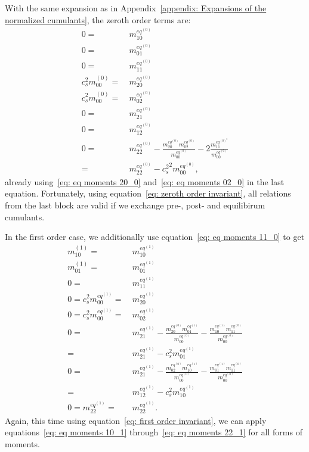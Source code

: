 With the same expansion as in Appendix~\ref{appendix: Expansions of the normalized cumulants}, the zeroth order terms are:
\begin{align}
  \label{eq: eq moments 10_0}
  0 = &\ m_{10}^{eq^{(0)}}
  \\
  \label{eq: eq moments 01_0}
  0 = &\ m_{01}^{eq^{(0)}}
  \\
  \label{eq: eq moments 11_0}
  0 = &\ m_{11}^{eq^{(0)}}
  \\
  \label{eq: eq moments 20_0}
  c_s^2 m_{00}^{(0)} = &\ m_{20}^{eq^{(0)}}
  \\
  \label{eq: eq moments 02_0}
  c_s^2 m_{00}^{(0)} = &\ m_{02}^{eq^{(0)}}
  \\
  \label{eq: eq moments 21_0}
  0 = &\ m_{21}^{eq^{(0)}}
  \\
  \label{eq: eq moments 12_0}
  0 = &\ m_{12}^{eq^{(0)}}
  \\
  \label{eq: eq moments 22_0}
  0 = &\ m_{22}^{eq^{(0)}} - \frac{ m_{20}^{eq^{(0)}} m_{02}^{eq^{(0)}} }{m_{00}^{eq^{(0)}}} - 2\frac{ m_{11}^{eq^{{(0)}^2}}}{m_{00}^{eq^{(0)}}}
  \\ = &\ m_{22}^{eq^{(0)}} - {c_s^2}^2 m_{00}^{eq^{(0)}},
\end{align}
already using~\eqref{eq: eq moments 20_0} and~\eqref{eq: eq moments 02_0} in the last equation.
Fortunately, using equation~\eqref{eq: zeroth order invariant}, all relations from the last block are valid if we exchange pre-, post- and equilibirum cumulants.

In the first order case, we additionally use equation~\eqref{eq: eq moments 11_0} to get
\begin{align}
  \label{eq: eq moments 10_1}
  m_{10}^{(1)} = &\ m_{10}^{eq^{(1)}}
  \\
  \label{eq: eq moments 01_1}
  m_{01}^{(1)} = &\ m_{01}^{eq^{(1)}}
  \\
  \label{eq: eq moments 11_1}
  0 = &\ m_{11}^{eq^{(1)}}
  \\
  \label{eq: eq moments 20_1}
  0 = c_s^2 m_{00}^{eq^{(1)}} = &\ m_{20}^{eq^{(1)}}
  \\
  \label{eq: eq moments 02_1}
  0 = c_s^2 m_{00}^{eq^{(1)}} = &\ m_{02}^{eq^{(1)}}
  \\\nonumber
  0 = &\ m_{21}^{eq^{(1)}}
  - \frac{m_{20}^{eq^{(0)}} m_{01}^{eq^{(1)}}}{m_{00}^{eq^{(0)}}}
  - \frac{m_{10}^{eq^{(1)}} m_{11}^{eq^{(0)}}}{m_{00}^{eq^{(0)}}}
  \\
  \label{eq: eq moments 21_1}
  = &\ m_{21}^{eq^{(1)}}
  - c_s^2 m_{01}^{eq^{(1)}}
  \\\nonumber
  0 = &\ m_{21}^{eq^{(1)}}
  - \frac{m_{02}^{eq^{(0)}} m_{10}^{eq^{(1)}}}{m_{00}^{eq^{(0)}}}
  - \frac{m_{01}^{eq^{(1)}} m_{11}^{eq^{(0)}}}{m_{00}^{eq^{(0)}}}
  \\
  \label{eq: eq moments 12_1}
  = &\ m_{12}^{eq^{(1)}}
  - c_s^2 m_{10}^{eq^{(1)}}
  \\
  \label{eq: eq moments 22_1}
  0 = m_{22}^{eq^{(1)}} =&\ m_{22}^{eq^{(1)}}.
\end{align}
Again, this time using equation~\eqref{eq: first order invariant}, we can apply equations~\eqref{eq: eq moments 10_1} through~\eqref{eq: eq moments 22_1} for all forms of moments.

